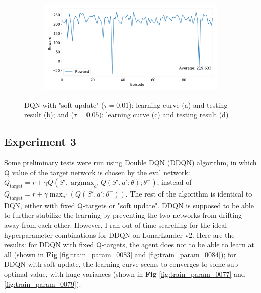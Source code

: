 \documentclass[10pt]{article}
\DeclareMathOperator*{\argmax}{argmax} %
\begin{document}
\begin{figure}[H]
\begin{subfigure}[b]{0.49\linewidth}
      \caption{}
  \label{fig:train_param_0060}
  \end{subfigure}
  \begin{subfigure}[b]{0.49\linewidth}
  \centering
  \includegraphics[width=\linewidth]{../logs/test_param_0060.png}
      \caption{}
  \label{fig:test_param_0060}
  \end{subfigure}
  \caption{DQN with "soft update" ($\tau=0.01$): learning curve (a) and testing result (b); and ($\tau=0.05$): learning curve (c) and testing result (d)}
  \label{fig:param_00590060}
\end{figure}


\subsection{Experiment 3} \label{experiment3}
Some preliminary tests were run using Double DQN (DDQN) algorithm\cite{vanHasseltDeepReinforcementLearning2015}, in which Q value of the target network is chosen by the eval network: $Q_{\text{target}}=r+\gamma Q(S',\argmax_{a'}Q(S',a';\theta);\theta^-)$, instead of $Q_{\text{target}}=r+\gamma \max_{a'}(Q(S',a';\theta^-))$. The rest of the algorithm is identical to DQN, either with fixed Q-targets or "soft update". DDQN is supposed to be able to further stabilize the learning by preventing the two networks from drifting away from each other. However, I ran out of time searching for the ideal hyperparameter combinations for DDQN on LunarLander-v2. Here are the results: for DDQN with fixed Q-targets, the agent does not to be able to learn at all (shown in \textbf{Fig} \ref{fig:train_param_0083} and \ref{fig:train_param_0084}); for DDQN with soft update, the learning curve seems to converges to some sub-optimal value, with huge variances (shown in \textbf{Fig} \ref{fig:train_param_0077} and \ref{fig:train_param_0079}).
\end{document}
